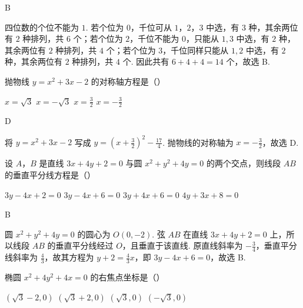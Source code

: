 \documentclass[UTF8,a4paper,oneside,11pt]{ctexbook}
\begin{document}
\begin{answer}B\end{answer}

\begin{solution}
四位数的个位不能为 \(1\). 若个位为 \(0\)，千位可从 \(1\)，\(2\)，\(3\) 中选，有 \(3\) 种，其余两位有 \(2\) 种排列，共 \(6\) 个；若个位为 \(2\)，千位不能为 \(0\)，只能从 \(1,3\) 中选，有 \(2\) 种，其余两位有 \(2\) 种排列，共 \(4\) 个；若个位为 \(3\)，千位同样只能从 \(1,2\) 中选，有 \(2\) 种，其余两位有 \(2\) 种排列，共 \(4\) 个. 因此共有 \(6+4+4=14\) 个，故选 B.
\end{solution}

\begin{problem}
抛物线 \(y=x^{2}+3x-2\) 的对称轴方程是（\quad）

\choices
{\(x=\sqrt3\)}
{\(x=-\sqrt3\)}
{\(x=\frac32\)}
{\(x=-\frac32\)}
\end{problem}

\begin{answer}D\end{answer}

\begin{solution}
将 \(y=x^{2}+3x-2\) 写成 \(y=\left(x+\frac32\right)^{2}-\frac{17}{4}\). 抛物线的对称轴为 \(x=-\frac32\)，故选 D.
\end{solution}

\begin{problem}
设 \(A\)，\(B\) 是直线 \(3x+4y+2=0\) 与圆 \(x^{2}+y^{2}+4y=0\) 的两个交点，则线段 \(AB\) 的垂直平分线方程是（\quad）

\choices
{\(3y-4x+2=0\)}
{\(3y-4x+6=0\)}
{\(3y+4x+6=0\)}
{\(4y+3x+8=0\)}
\end{problem}

\begin{answer}B\end{answer}

\begin{solution}
圆 \(x^{2}+y^{2}+4y=0\) 的圆心为 \(O(0,-2)\). 弦 \(AB\) 在直线 \(3x+4y+2=0\) 上，所以线段 \(AB\) 的垂直平分线经过 \(O\)，且垂直于该直线. 原直线斜率为 \(-\frac34\)，垂直平分线斜率为 \(\frac43\)，故其方程为 \(y+2=\frac43x\)，即 \(3y-4x+6=0\)，故选 B.
\end{solution}

\begin{problem}
椭圆 \(x^{2}+4y^{2}+4x=0\) 的右焦点坐标是（\quad）

\choices
{\((\sqrt3-2,0)\)}
{\((\sqrt3+2,0)\)}
{\((\sqrt3,0)\)}
{\((-\sqrt3,0)\)}
\end{problem}
\end{document}

